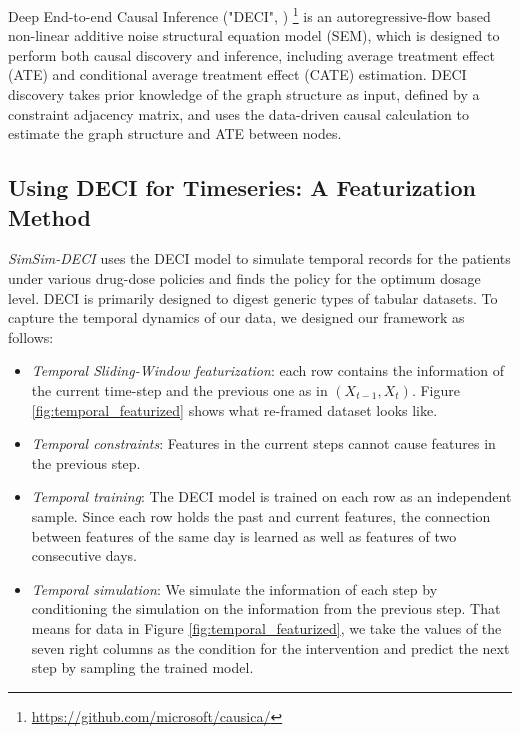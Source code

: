Deep End-to-end Causal Inference ("DECI", \cite{geffner2022deep})
\footnote{\url{https://github.com/microsoft/causica/}}
is an autoregressive-flow based non-linear additive noise structural equation model (SEM), which is designed to perform both causal discovery and inference, including average treatment effect (ATE) and conditional average treatment effect (CATE) estimation. DECI discovery takes prior knowledge of the graph structure as input, defined by a constraint adjacency matrix, and uses the data-driven causal calculation to estimate the graph structure and ATE between nodes.

\subsection{Using DECI for Timeseries: A Featurization Method}

\textit{SimSim-DECI} uses the DECI model to simulate temporal records for the patients under various drug-dose policies and finds the policy for the optimum dosage level. DECI is primarily designed to digest generic types of tabular datasets. To capture the temporal dynamics of our data, we designed our framework as follows:

\begin{itemize}
\item \textit{Temporal Sliding-Window featurization}: each row contains the information of the current time-step and the previous one as in \((X_{t-1},X_{t})\). Figure \ref{fig:temporal_featurized} shows what re-framed dataset looks like.

\item \textit{Temporal constraints}: Features in the current steps cannot cause features in the previous step.

\item \textit{Temporal training}: The DECI model is trained on each row as an independent sample. Since each row holds the past and current features, the connection between features of the same day is learned as well as features of two consecutive days.

\item \textit{Temporal simulation}: We simulate the information of each step by conditioning the simulation on the information from the previous step. That means for data in Figure \ref{fig:temporal_featurized}, we take the values of the seven right columns as the condition for the intervention and predict the next step by sampling the trained model.
\end{itemize}

